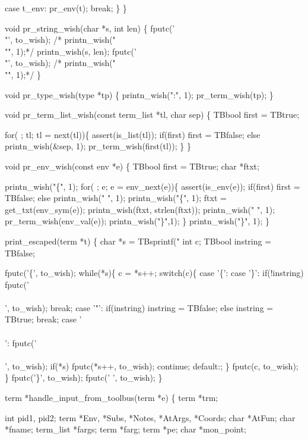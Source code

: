     case t_env:
      pr_env(t);
      break;
    \}
\}

void pr_string_wish(char *s, int len)
\{
  fputc('\\"', to_wish);
/*  printn_wish("\\"", 1);*/
  printn_wish(s, len);
  fputc('\\"', to_wish);
/*  printn_wish("\\"", 1);*/
\}

void pr_type_wish(type *tp)
\{
  printn_wish(":", 1); 
  pr_term_wish(tp);
\}

void pr_term_list_wish(const term_list *tl, char sep)
\{
  TBbool first = TBtrue;

  for( ; tl; tl = next(tl))\{
    assert(is_list(tl));    
    if(first)
      first = TBfalse;
    else
      printn_wish(&sep, 1);
    pr_term_wish(first(tl));
  \}
\}

void pr_env_wish(const env *e)
\{
  TBbool first = TBtrue;
  char *ftxt;

  printn_wish("\{", 1);
  for( ; e; e = env_next(e))\{
    assert(is_env(e));    
    if(first)
      first = TBfalse;
    else
      printn_wish(" ", 1);
    printn_wish("\{", 1);
    ftxt = get_txt(env_sym(e));
    printn_wish(ftxt, strlen(ftxt));
    printn_wish(" ", 1);
    pr_term_wish(env_val(e));
    printn_wish("\}",1);
  \}
  printn_wish("\}", 1);
\}


print_escaped(term *t)
\{
  char *s = TBsprintf("%
  int c;
  TBbool instring = TBfalse;

  fputc('\{', to_wish);
  while(*s)\{
    c = *s++;
    switch(c)\{
    case '\{': case '\}':
      if(!instring)
        fputc('\\\\', to_wish);
      break;
    case '"':      
      if(instring)
        instring = TBfalse;
      else
        instring = TBtrue;
      break;
    case '\\\\':
      fputc('\\\\', to_wish);
      if(*s)
        fputc(*s++, to_wish);
      continue;
    default:;
    \}
    fputc(c, to_wish);
  \}
  fputc('\}', to_wish);
  fputc(' ', to_wish);
\}


term *handle_input_from_toolbus(term *e)
\{
  term *trm;  

  int pid1, pid2;
  term *Env, *Subs, *Notes, *AtArgs, *Coords;
  char *AtFun;
  char *fname;
  term_list *fargs;
  term *farg;
  term *pe;
  char *mon_point;
  
